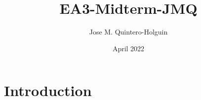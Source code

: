 \documentclass{article}
\title{EA3-Midterm-JMQ}
\author{Jose M. Quintero-Holguin}
\date{April 2022}
\begin{document}
\maketitle

\section{Introduction}
\end{document}
